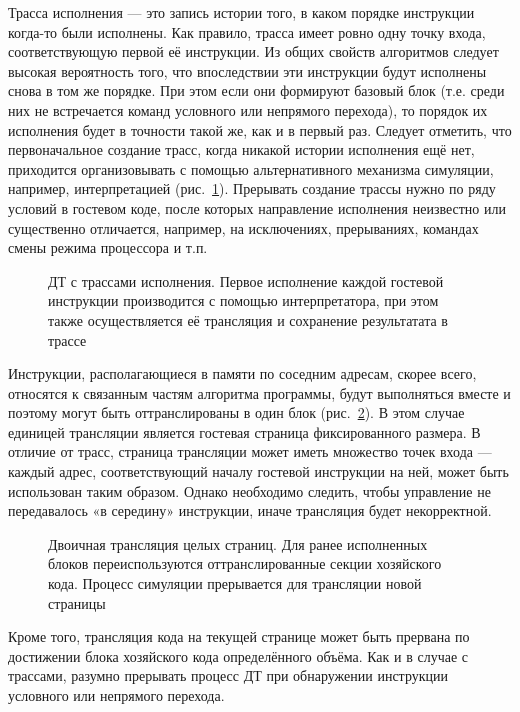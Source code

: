 \begin{enumerate*}
    
\item Трасса исполнения — это запись истории того, в каком порядке инструкции когда-то были исполнены. Как правило, трасса имеет ровно одну точку входа, соответствующую первой её инструкции. Из общих свойств алгоритмов следует высокая вероятность того, что впоследствии эти инструкции будут исполнены снова в том же порядке. При этом если они формируют базовый блок (т.е. среди них не встречается команд условного или непрямого перехода), то порядок их исполнения будет в точности такой же, как и в первый раз. Следует отметить, что первоначальное создание трасс, когда никакой истории исполнения ещё нет, приходится организовывать с помощью альтернативного механизма симуляции, например, интерпретацией (рис.~\ref{fig:bt-traces}). Прерывать создание трассы нужно по ряду условий в гостевом коде, после которых направление исполнения неизвестно или существенно отличается, например, на исключениях, прерываниях, командах смены режима процессора и т.п. %

\begin{figure}[htbp]
    \centering
    \caption[ДТ с трассами исполнения]{ДТ с трассами исполнения. Первое исполнение каждой гостевой инструкции производится с помощью интерпретатора, при этом также осуществляется её трансляция и сохранение результатата в трассе}
    \label{fig:bt-traces}
\end{figure}

\item Инструкции, располагающиеся в памяти по соседним адресам, скорее всего, относятся к связанным частям алгоритма программы, будут выполняться вместе и поэтому могут быть оттранслированы в один блок (рис.~\ref{fig:bt-pages}). В этом случае единицей трансляции является гостевая страница фиксированного размера. В отличие от трасс, страница трансляции может иметь множество точек входа — каждый адрес, соответствующий началу гостевой инструкции на ней, может быть использован таким образом. Однако необходимо следить, чтобы управление не передавалось «в середину» инструкции, иначе трансляция будет некорректной.

\begin{figure}[htb]
    \centering
    \caption[Двоичная трансляция целых страниц]{Двоичная трансляция целых страниц. Для ранее исполненных блоков переиспользуются оттранслированные секции хозяйского кода. Процесс симуляции прерывается для трансляции новой страницы}
    \label{fig:bt-pages}
\end{figure}

Кроме того, трансляция кода на текущей странице может быть прервана по достижении блока хозяйского кода определённого объёма. Как и в случае с трассами, разумно прерывать процесс ДТ при обнаружении инструкции условного или непрямого перехода. 

\end{enumerate*}


